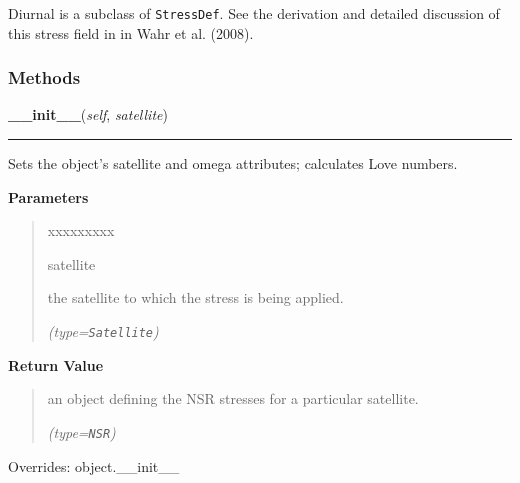Diurnal is a subclass of \texttt{StressDef}.  See the derivation and 
detailed discussion of this stress field in in Wahr et al. (2008).



  \subsubsection{Methods}

    \vspace{0.5ex}

\hspace{.8\funcindent}\begin{boxedminipage}{\funcwidth}

    \raggedright \textbf{\_\_init\_\_}(\textit{self}, \textit{satellite})

    \vspace{-1.5ex}

    \rule{\textwidth}{0.5\fboxrule}
\setlength{\parskip}{2ex}
    Sets the object's satellite and omega attributes; calculates Love 
    numbers.

\setlength{\parskip}{1ex}
      \textbf{Parameters}
      \vspace{-1ex}

      \begin{quote}
        \begin{Ventry}{xxxxxxxxx}

          \item[satellite]

          the satellite to which the stress is being applied.

            {\it (type=\texttt{Satellite})}

        \end{Ventry}

      \end{quote}

      \textbf{Return Value}
    \vspace{-1ex}

      \begin{quote}
      an object defining the NSR stresses for a particular satellite.

      {\it (type=\texttt{NSR})}

      \end{quote}

      Overrides: object.\_\_init\_\_

    \end{boxedminipage}

